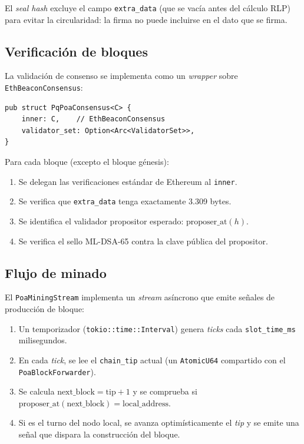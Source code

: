 El \emph{seal hash} excluye el campo \texttt{extra\_data} (que se vacía antes del cálculo RLP) para evitar la circularidad: la firma no puede incluirse en el dato que se firma.

\subsection{Verificación de bloques}

La validación de consenso se implementa como un \emph{wrapper} sobre \texttt{EthBeaconConsensus}:

\begin{lstlisting}[style=rustcode, caption={Consenso PoA: validación de bloques.}, label={lst:poa_consensus}]
pub struct PqPoaConsensus<C> {
    inner: C,    // EthBeaconConsensus
    validator_set: Option<Arc<ValidatorSet>>,
}
\end{lstlisting}

Para cada bloque (excepto el bloque génesis):
\begin{enumerate}
  \item Se delegan las verificaciones estándar de Ethereum al \texttt{inner}.
  \item Se verifica que \texttt{extra\_data} tenga exactamente 3.309 bytes.
  \item Se identifica el validador propositor esperado: $\text{proposer\_at}(h)$.
  \item Se verifica el sello ML-DSA-65 contra la clave pública del propositor.
\end{enumerate}

\subsection{Flujo de minado}

El \texttt{PoaMiningStream} implementa un \emph{stream} asíncrono que emite señales de producción de bloque:

\begin{enumerate}
  \item Un temporizador (\texttt{tokio::time::Interval}) genera \emph{ticks} cada \texttt{slot\_time\_ms} milisegundos.
  \item En cada \emph{tick}, se lee el \texttt{chain\_tip} actual (un \texttt{AtomicU64} compartido con el \texttt{PoaBlockForwarder}).
  \item Se calcula $\text{next\_block} = \text{tip} + 1$ y se comprueba si $\text{proposer\_at}(\text{next\_block}) = \text{local\_address}$.
  \item Si es el turno del nodo local, se avanza optimísticamente el \emph{tip} y se emite una señal que dispara la construcción del bloque.
\end{enumerate}


